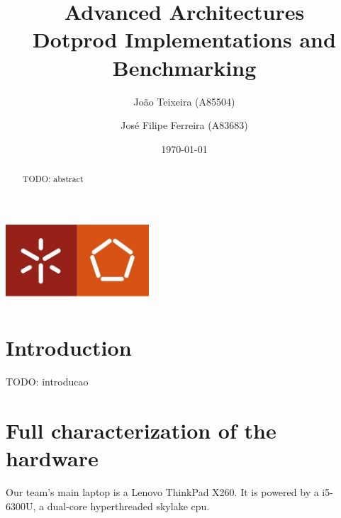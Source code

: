 \documentclass[a4paper]{report}
\begin{document}
\title{Advanced Architectures\\Dotprod Implementations and Benchmarking}
\author{João Teixeira (A85504) \and José Filipe Ferreira (A83683)}
\date{\today}

\begin{center}
    \begin{minipage}{0.75\linewidth}
        \centering
        \includegraphics[width=0.4\textwidth]{images/eng.jpeg}\par\vspace{1cm}
        \vspace{1.5cm}
        \href{https://www.uminho.pt/PT}
        {\color{black}{\scshape\LARGE Universidade do Minho}} \par
        \vspace{1cm}
        \href{https://www.di.uminho.pt/}
        {\color{black}{\scshape\Large Departamento de Informática}} \par
        \vspace{1.5cm}
        \maketitle
    \end{minipage}
\end{center}

\begin{abstract}
    \begin{center}
        TODO: abstract
    \end{center}
\end{abstract}

\tableofcontents

\listoftables

\listoffigures

\chapter{Introduction}
TODO: introducao

\chapter{Full characterization of the hardware}
Our team's main laptop is a Lenovo ThinkPad X260. It is powered by a i5-6300U, a
dual-core hyperthreaded skylake cpu.
\end{document}
